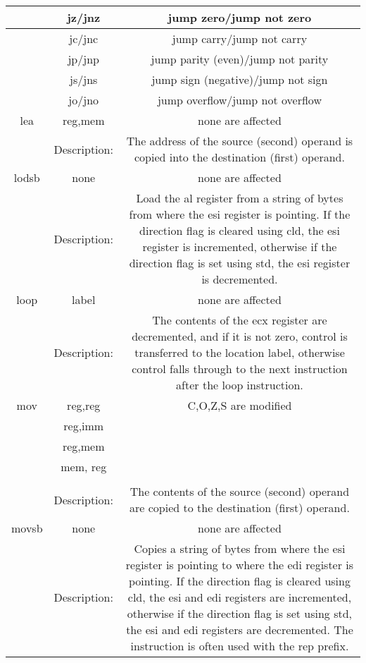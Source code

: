 \documentclass[10pt]{article}
\begin{document}
\begin{center}
\begin{tabular}{|c|c|c|}
\hline
 & jz/jnz & jump zero/jump not zero \\
\hline
 & jc/jnc & jump carry/jump not carry \\
\hline
 & jp/jnp & jump parity (even)/jump not parity \\
\hline
 & js/jns & jump sign (negative)/jump not sign \\
\hline
 & jo/jno & jump overflow/jump not overflow \\
\hline
lea & reg,mem & none are affected \\
\hline
 & Description: & The address of the source (second) operand is copied into the destination (first) operand. \\
\hline
lodsb & none & none are affected \\
\hline
 & Description: & Load the al register from a string of bytes from where the esi register is pointing. If the direction flag is cleared using cld, the esi register is incremented, otherwise if the direction flag is set using std, the esi register is decremented. \\
\hline
loop & label & none are affected \\
\hline
 & Description: & The contents of the ecx register are decremented, and if it is not zero, control is transferred to the location label, otherwise control falls through to the next instruction after the loop instruction. \\
\hline
mov & reg,reg & C,O,Z,S are modified \\
\hline
 & reg,imm &  \\
\hline
 & reg,mem &  \\
\hline
 & mem, reg &  \\
\hline
 &  &  \\
\hline
 & Description: & The contents of the source (second) operand are copied to the destination (first) operand. \\
\hline
movsb & none & none are affected \\
\hline
 & Description: & Copies a string of bytes from where the esi register is pointing to where the edi register is pointing. If the direction flag is cleared using cld, the esi and edi registers are incremented, otherwise if the direction flag is set using std, the esi and edi registers are decremented. The instruction is often used with the rep prefix. \\
\hline
\end{tabular}
\end{center}
\end{document}
